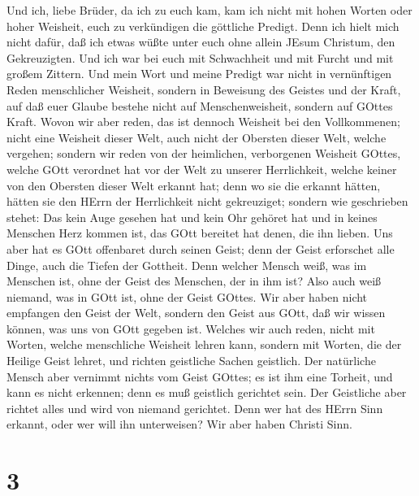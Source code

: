  Und ich, liebe Brüder, da ich zu euch kam, kam ich nicht
mit hohen Worten oder hoher Weisheit, euch zu verkündigen die göttliche
Predigt.  Denn ich hielt mich nicht dafür, daß ich etwas
wüßte unter euch ohne allein JEsum Christum, den Gekreuzigten.
 Und ich war bei euch mit Schwachheit und mit Furcht und mit
großem Zittern.  Und mein Wort und meine Predigt war nicht
in vernünftigen Reden menschlicher Weisheit, sondern in Beweisung des
Geistes und der Kraft,  auf daß euer Glaube bestehe nicht
auf Menschenweisheit, sondern auf GOttes Kraft.  Wovon wir
aber reden, das ist dennoch Weisheit bei den Vollkommenen; nicht eine
Weisheit dieser Welt, auch nicht der Obersten dieser Welt, welche
vergehen;  sondern wir reden von der heimlichen, verborgenen
Weisheit GOttes, welche GOtt verordnet hat vor der Welt zu unserer
Herrlichkeit,  welche keiner von den Obersten dieser Welt
erkannt hat; denn wo sie die erkannt hätten, hätten sie den HErrn der
Herrlichkeit nicht gekreuziget;  sondern wie geschrieben
stehet: Das kein Auge gesehen hat und kein Ohr gehöret hat und in keines
Menschen Herz kommen ist, das GOtt bereitet hat denen, die ihn lieben.
 Uns aber hat es GOtt offenbaret durch seinen Geist; denn
der Geist erforschet alle Dinge, auch die Tiefen der Gottheit.
 Denn welcher Mensch weiß, was im Menschen ist, ohne der
Geist des Menschen, der in ihm ist? Also auch weiß niemand, was in GOtt
ist, ohne der Geist GOttes.  Wir aber haben nicht empfangen
den Geist der Welt, sondern den Geist aus GOtt, daß wir wissen können,
was uns von GOtt gegeben ist.  Welches wir auch reden,
nicht mit Worten, welche menschliche Weisheit lehren kann, sondern mit
Worten, die der Heilige Geist lehret, und richten geistliche Sachen
geistlich.  Der natürliche Mensch aber vernimmt nichts vom
Geist GOttes; es ist ihm eine Torheit, und kann es nicht erkennen; denn
es muß geistlich gerichtet sein.  Der Geistliche aber
richtet alles und wird von niemand gerichtet.  Denn wer hat
des HErrn Sinn erkannt, oder wer will ihn unterweisen? Wir aber haben
Christi Sinn.

\hypertarget{section-2}{%
\section{3}\label{section-2}}

